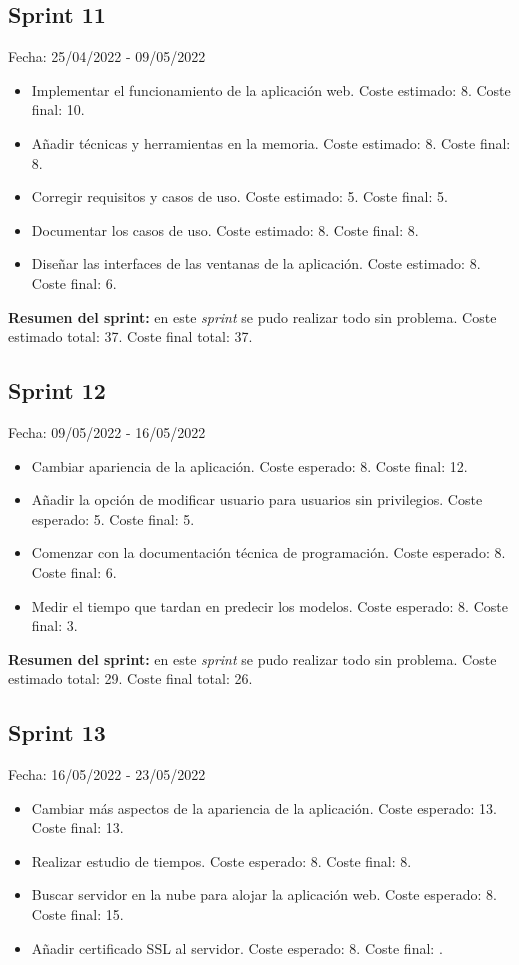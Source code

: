 \subsection{Sprint 11}
Fecha: 25/04/2022 - 09/05/2022
\begin{itemize}
	\item Implementar el funcionamiento de la aplicación web. Coste estimado: 8. Coste final: 10.
	\item Añadir técnicas y herramientas en la memoria. Coste estimado: 8. Coste final: 8.
	\item Corregir requisitos y casos de uso. Coste estimado: 5. Coste final: 5.
	\item Documentar los casos de uso. Coste estimado: 8. Coste final: 8.
	\item Diseñar las interfaces de las ventanas de la aplicación. Coste estimado: 8. Coste final: 6.
\end{itemize}

\textbf{Resumen del sprint:} en este \textit{sprint} se pudo realizar todo sin problema. Coste estimado total: 37. Coste final total: 37.

\subsection{Sprint 12}
Fecha: 09/05/2022 - 16/05/2022
\begin{itemize}
	\item Cambiar apariencia de la aplicación. Coste esperado: 8. Coste final: 12.
	\item Añadir la opción de modificar usuario para usuarios sin privilegios. Coste esperado: 5. Coste final: 5.
	\item Comenzar con la documentación técnica de programación. Coste esperado: 8. Coste final: 6.
	\item Medir el tiempo que tardan en predecir los modelos. Coste esperado: 8. Coste final: 3.
\end{itemize}

\textbf{Resumen del sprint:} en este \textit{sprint} se pudo realizar todo sin problema. Coste estimado total: 29. Coste final total: 26.

\subsection{Sprint 13}
Fecha: 16/05/2022 - 23/05/2022
\begin{itemize}
	\item Cambiar más aspectos de la apariencia de la aplicación. Coste esperado: 13. Coste final: 13.
	\item Realizar estudio de tiempos. Coste esperado: 8. Coste final: 8.
	\item Buscar servidor en la nube para alojar la aplicación web. Coste esperado: 8. Coste final: 15.
	\item Añadir certificado SSL al servidor. Coste esperado: 8. Coste final: .
\end{itemize}

